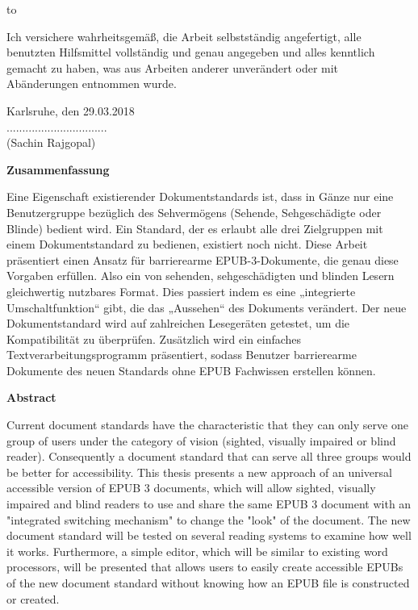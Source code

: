 \thispagestyle{empty}
\vspace*{36\baselineskip}
\hbox to \textwidth{\hrulefill}
\par
Ich versichere wahrheitsgemäß, die Arbeit selbstständig angefertigt, alle benutzten Hilfsmittel vollständig und genau angegeben und alles kenntlich gemacht zu haben, was aus Arbeiten anderer unverändert oder mit Abänderungen entnommen wurde.

Karlsruhe, den 29.03.2018 %
\vspace*{2\baselineskip}
\\

................................ \\
(Sachin Rajgopal)
\cleardoublepage

\vspace*{1em}
\begin{center}
	\textbf{Zusammenfassung}
\end{center}
\par
Eine Eigenschaft existierender Dokumentstandards ist, dass in Gänze nur eine Benutzergruppe bezüglich des Sehvermögens (Sehende, Sehgeschädigte oder Blinde) bedient wird. Ein Standard, der es erlaubt alle drei Zielgruppen mit einem Dokumentstandard zu bedienen, existiert noch nicht.
Diese Arbeit präsentiert einen Ansatz für barrierearme EPUB-3-Dokumente, die genau diese Vorgaben erfüllen. Also ein von sehenden, sehgeschädigten und blinden Lesern gleichwertig nutzbares Format. Dies passiert indem es eine „integrierte Umschaltfunktion“ gibt, die das „Aussehen“ des Dokuments verändert. Der neue Dokumentstandard wird auf zahlreichen Lesegeräten getestet, um die Kompatibilität zu überprüfen. Zusätzlich wird ein einfaches Textverarbeitungsprogramm präsentiert, sodass Benutzer barrierearme Dokumente des neuen Standards ohne EPUB Fachwissen erstellen können. 


\cleardoublepage
\vspace*{1em}
\begin{center}
	\textbf{Abstract}
\end{center}
\par
Current document standards have the characteristic that they can only serve one group of users under the category of vision (sighted, visually impaired or blind reader). Consequently a document standard that can serve all three groups would be better for accessibility.
This thesis presents a new approach of an universal accessible version of EPUB 3 documents, which will allow sighted, visually impaired and blind readers to use and share the same EPUB 3 document with an "integrated switching mechanism" to change the "look" of the document. The new document standard will be tested on several reading systems to examine how well it works. Furthermore, a simple editor, which will be similar to existing word processors, will be presented that allows users to easily create accessible EPUBs of the new document standard without knowing how an EPUB file is constructed or created. 


\cleardoublepage

